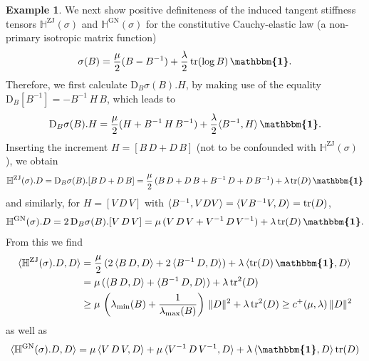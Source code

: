 \documentclass[10pt]{article}
\newcounter{theoremCounter}
\numberwithin{theoremCounter}{section}
\theoremstyle{plain}
\theoremstyle{definition}
\newtheorem{example}[theoremCounter]{Example}
\newcommand{\id}{{\boldsymbol{\mathbbm{1}}}}
\newcommand{\norm}[1]{\lVert #1 \rVert}
\newcommand{\DD}{\mathrm{D}}
\DeclareMathOperator{\tr}{tr}
\DeclareMathOperator{\ZJ}{ZJ}
\DeclareMathOperator{\GN}{GN}
\def\tr{\textnormal{tr}}
\def\H{\mathbb{H}}
\numberwithin{equation}{section}
\begin{document}
%
\begin{example}
We next show positive definiteness of the induced tangent stiffness tensors $\H^{\ZJ}(\sigma)$ and $\H^{\GN}(\sigma)$ for the constitutive Cauchy-elastic law (a non-primary isotropic matrix function)
	\begin{align}
	\label{eqthesecondlaw1}
	\sigma(B) = \frac{\mu}{2} (B - B^{-1}) + \frac{\lambda}{2} \, \tr(\log B) \, \id.
	\end{align}
Therefore, we first calculate $\DD_B \sigma(B).H$, by making use of the equality $\DD_B [B^{-1}] = - B^{-1} \, H \, B$, which leads to
	\begin{equation}
	\DD_B\sigma(B).H = \frac{\mu}{2} (H + B^{-1} \, H \, B^{-1}) + \frac{\lambda}{2} \langle B^{-1} , H \rangle \, \id.
	\end{equation}
Inserting the increment $H = [B \, D + D \, B]$ (not to be confounded with $\H^{\ZJ}(\sigma)$), we obtain
	\begin{align}
	\H^{\ZJ}(\sigma).D = \DD_B\sigma(B).[B \, D + D \, B] = \frac{\mu}{2} \, (B \, D + D \, B + B^{-1} \, D + D \, B^{-1})
+ \lambda \, \tr(D) \, \id
	\end{align}
and similarly, for $H = [V \, D \, V]$ with $\langle B^{-1},VDV\rangle=\langle VB^{-1}V,D\rangle=\tr(D)$,
	\begin{align}
	\H^{\GN}(\sigma).D = 2 \, \DD_B\sigma(B).[V \, D \, V] = \mu \, (V \, D \, V + V^{-1} \, D \, V^{-1}) + \lambda \, \tr(D) \, \id.
	\end{align}
From this we find
	\begin{equation}
	\label{eqthelatter01}
	\begin{alignedat}{2}
	\langle \H^{\ZJ}(\sigma) . D , D \rangle &= \frac{\mu}{2} \, (2 \, \langle B \, D , D \rangle + 2 \, \langle B^{-1} \, D , D \rangle) + \lambda \, \langle \tr(D) \, \id , D \rangle \\
	&= \mu \, (\langle B \, D , D \rangle + \langle B^{-1} \, D , D \rangle) + \lambda \, \tr^2(D) \\
	&\ge \mu \, \left(\lambda_{\min}(B) + \frac{1}{\lambda_{\max}(B)}\right) \, \norm{D}^2 + \lambda \, \tr^2(D) \ge c^+(\mu, \lambda) \, \norm{D}^2
	\end{alignedat}
	\end{equation}
as well as
	\begin{equation}
	\begin{alignedat}{2}
	\langle \H^{\GN}(\sigma).D,D \rangle &= \mu \, \langle V \, D \, V , D \rangle + \mu \, \langle V^{-1} \, D \, V^{-1} , D \rangle + \lambda \, \langle \id , D \rangle \, \tr(D) \\

\end{alignedat}
\end{equation}
\end{example}
\end{document}
